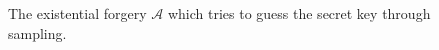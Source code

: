 \begin{figure}
\begin{algorithm}[H]
    \caption{\label{alg.forgery-adversary}
    The existential forgery $\mathcal{A}$
    which tries to guess the secret key through sampling.}
    \begin{algorithmic}[1]
            \State{}
        \EndFunction
    \end{algorithmic}
\end{algorithm}
\end{figure}
